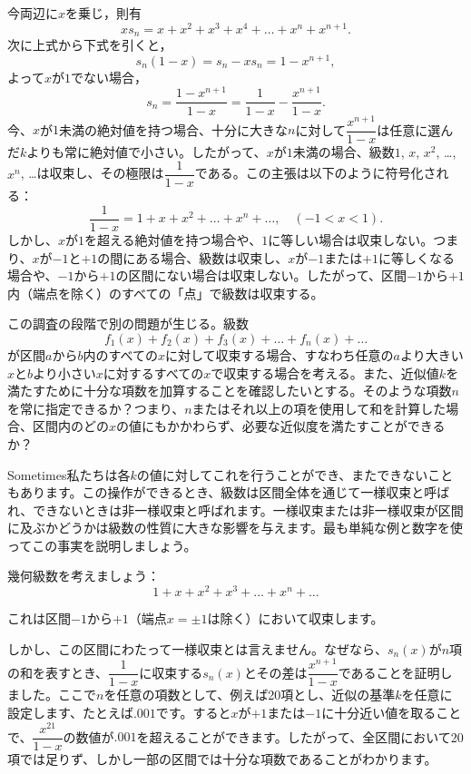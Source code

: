 \documentclass[a4paper,11pt,openany]{ltjsbook}
\begin{document}
今両辺に$x$を乗じ，則有
\[
xs_{n} = x + x^{2} + x^{3} + x^{4} + \dots + x^{n} + x^{n+1}.
\]
次に上式から下式を引くと，
\[
s_{n}(1 - x) = s_{n} - xs_{n} = 1 - x^{n+1},
\]
よって$x$が$1$でない場合，
\[
s_{n} = \frac{1 - x^{n+1}}{1 - x}
  = \frac{1}{1 - x} - \frac{x^{n+1}}{1 - x}.
\]
今、$x$が$1$未満の絶対値を持つ場合、十分に大きな$n$に対して$\dfrac{x^{n+1}}{1 - x}$は任意に選んだ$k$よりも常に絶対値で小さい。したがって、$x$が$1$未満の場合、級数$1$, $x$, $x^{2}$, \dots, $x^{n}$, \dots は収束し、その極限は$\dfrac{1}{1 - x}$である。この主張は以下のように符号化される：
\[
\frac{1}{1 - x} = 1 + x + x^{2} + \dots + x^{n} + \dots,\quad
(-1 < x < 1).
\]
しかし、$x$が$1$を超える絶対値を持つ場合や、$1$に等しい場合は収束しない。つまり、$x$が$-1$と$+1$の間にある場合、級数は収束し、$x$が$-1$または$+1$に等しくなる場合や、$-1$から$+1$の区間にない場合は収束しない。したがって、区間$-1$から$+1$内（端点を除く）のすべての「点」で級数は収束する。

この調査の段階で別の問題が生じる。級数
\[
f_{1}(x) + f_{2}(x) + f_{3}(x) + \dots + f_{n}(x) + \dots
\]
が区間$a$から$b$内のすべての$x$に対して収束する場合、すなわち任意の$a$より大きい$x$と$b$より小さい$x$に対するすべての$x$で収束する場合を考える。また、近似値$k$を満たすために十分な項数を加算することを確認したいとする。そのような項数$n$を常に指定できるか？つまり、$n$またはそれ以上の項を使用して和を計算した場合、区間内のどの$x$の値にもかかわらず、必要な近似度を満たすことができるか？

Sometimes私たちは各$k$の値に対してこれを行うことができ、またできないこともあります。この操作ができるとき、級数は区間全体を通じて一様収束と呼ばれ、できないときは非一様収束と呼ばれます。一様収束または非一様収束が区間に及ぶかどうかは級数の性質に大きな影響を与えます。最も単純な例と数字を使ってこの事実を説明しましょう。

幾何級数を考えましょう：
\[
1 + x + x^{2} + x^{3} + \dots + x^{n} + \dots
\]

これは区間$-1$から$+1$（端点$x = ±1$は除く）において収束します。

しかし、この区間にわたって一様収束とは言えません。なぜなら、$s_{n}(x)$が$n$項の和を表すとき、$\dfrac{1}{1 - x}$に収束する$s_{n}(x)$とその差は$\dfrac{x^{n+1}}{1 - x}$であることを証明しました。ここで$n$を任意の項数として、例えば20項とし、近似の基準$k$を任意に設定します、たとえば$.001$です。すると$x$が$+1$または$-1$に十分近い値を取ることで、$\dfrac{x^{21}}{1 - x}$の数値が$.001$を超えることができます。したがって、全区間において20項では足りず、しかし一部の区間では十分な項数であることがわかります。
\end{document}
